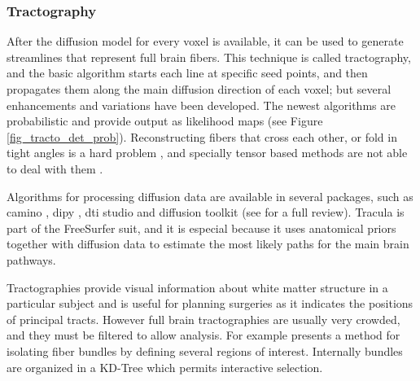 \subsubsection{Tractography}

After the diffusion model for every voxel is available, it can be used to generate streamlines that represent full brain fibers. This technique is called tractography, and the basic algorithm starts each line at specific seed points, and then propagates them along the main diffusion direction of each voxel; but several enhancements and variations have been developed. The newest algorithms are probabilistic \autocite{behrens_probabilistic_2007} and provide output as likelihood maps (see Figure \ref{fig_tracto_det_prob}).
Reconstructing fibers that cross each other, or fold in tight angles is a hard problem \autocite{fillard_quantitative_2011}, and specially tensor based methods are not able to deal with them \autocite{tournier_diffusion_2011}. 

Algorithms for processing diffusion data are available in several packages, such as camino \autocite{cook_camino:_2006}, dipy \autocite{garyfallidis_dipy_2014}, dti studio \autocite{jiang_dtistudio:_2006} and diffusion toolkit \autocite{wang_diffusion_2007}
(see \autocite{hasan_review_2011} for a full review). 
Tracula \autocite{yendiki_probabilistic_2008} is part of the FreeSurfer suit, and it is especial because it uses anatomical priors together with diffusion data to estimate the most likely paths for the main brain pathways.


Tractographies provide visual information about white matter structure in a particular subject and  is useful for planning surgeries as it indicates the positions of principal tracts. However full brain tractographies are usually very crowded, and they must be filtered to allow analysis. 
For example \autocite{blaas_fast_2005} presents a method for isolating fiber bundles by defining several regions of interest. Internally bundles are organized in a KD-Tree which permits interactive selection. 


